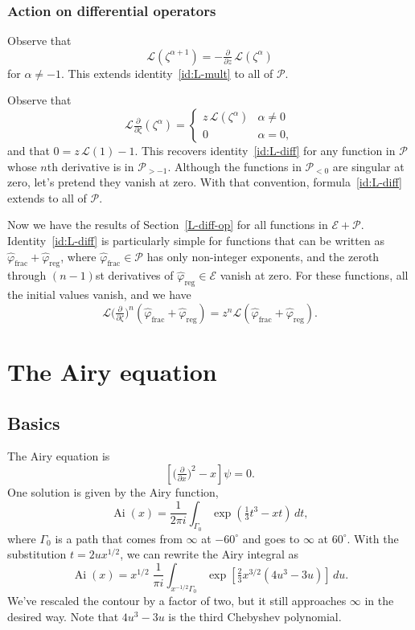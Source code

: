 \documentclass{article}
\theoremstyle{definition}
\theoremstyle{plain}
\newcommand{\laplace}{\mathcal{L}}
\DeclareMathOperator{\Ai}{Ai}
\begin{document}
\subsubsection{Action on differential operators}
Observe that
\[ \laplace(\zeta^{\alpha + 1}) = -\tfrac{\partial}{\partial z}\,\laplace(\zeta^\alpha) \]
for $\alpha \neq -1$. This extends identity~\ref{id:L-mult} to all of $\mathcal{P}$.

Observe that
\[ \laplace\tfrac{\partial}{\partial \zeta}(\zeta^\alpha) = \begin{cases}
z\,\laplace(\zeta^\alpha) & \alpha \neq 0 \\
0 & \alpha = 0,
\end{cases} \]
and that $0 = z\,\laplace(1) - 1$. This recovers identity~\ref{id:L-diff} for any function in $\mathcal{P}$ whose $n$th derivative is in $\mathcal{P}_{> -1}$. Although the functions in $\mathcal{P}_{< 0}$ are singular at zero, let's pretend they vanish at zero. With that convention, formula~\ref{id:L-diff} extends to all of $\mathcal{P}$.

Now we have the results of Section~\ref{L-diff-op} for all functions in $\mathcal{E} + \mathcal{P}$. Identity~\ref{id:L-diff} is particularly simple for functions that can be written as $\hat{\varphi}_\text{frac} + \hat{\varphi}_\text{reg}$, where $\hat{\varphi}_\text{frac} \in \mathcal{P}$ has only non-integer exponents, and the zeroth through $(n-1)$st derivatives of $\hat{\varphi}_\text{reg} \in \mathcal{E}$ vanish at zero. For these functions, all the initial values vanish, and we have
\[ \laplace \big(\tfrac{\partial}{\partial \zeta}\big)^n (\hat{\varphi}_\text{frac} + \hat{\varphi}_\text{reg}) = z^n \laplace (\hat{\varphi}_\text{frac} + \hat{\varphi}_\text{reg}). \]
\section{The Airy equation}
\subsection{Basics}
The Airy equation is
\begin{equation}\label{eqn:airy}
\left[\big(\tfrac{\partial}{\partial x}\big)^2 - x\right] \psi = 0.
\end{equation}
One solution is given by the Airy function,
\[ \Ai(x) = \frac{1}{2\pi i} \int_{\Gamma_0} \exp\left(\tfrac{1}{3}t^3 - xt\right)\,dt, \]
where $\Gamma_0$ is a path that comes from $\infty$ at $-60^\circ$ and goes to $\infty$ at $60^\circ$. With the substitution $t = 2ux^{1/2}$, we can rewrite the Airy integral as
\[ \Ai(x) = x^{1/2}\;\frac{1}{\pi i} \int_{x^{-1/2} \Gamma_0} \exp\left[\tfrac{2}{3}x^{3/2} \left(4u^3 - 3u\right)\right]\,du. \]
We've rescaled the contour by a factor of two, but it still approaches $\infty$ in the desired way. Note that $4u^3 - 3u$ is the third Chebyshev polynomial.
\end{document}

